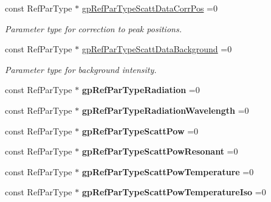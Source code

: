 \begin{DoxyCompactItemize}
const Ref\+Par\+Type $\ast$ \mbox{\hyperlink{namespace_obj_cryst_a647de83807cf5671a6ffd8c402a6ebf2}{gp\+Ref\+Par\+Type\+Scatt\+Data\+Corr\+Pos}} =0
\begin{DoxyCompactList}\small\item\em Parameter type for correction to peak positions. \end{DoxyCompactList}\item 
\mbox{\label{namespace_obj_cryst_a713fa15995c98dcd5cf5e2dbfed2dc12}} 
const Ref\+Par\+Type $\ast$ \mbox{\hyperlink{namespace_obj_cryst_a713fa15995c98dcd5cf5e2dbfed2dc12}{gp\+Ref\+Par\+Type\+Scatt\+Data\+Background}} =0
\begin{DoxyCompactList}\small\item\em Parameter type for background intensity. \end{DoxyCompactList}\item 
\mbox{\label{namespace_obj_cryst_ab8d362676b072a0af9c1faec189c5cc3}} 
const Ref\+Par\+Type $\ast$ {\bfseries gp\+Ref\+Par\+Type\+Radiation} =0
\item 
\mbox{\label{namespace_obj_cryst_a7f394acf301f2f72112266dfe499d685}} 
const Ref\+Par\+Type $\ast$ {\bfseries gp\+Ref\+Par\+Type\+Radiation\+Wavelength} =0
\item 
\mbox{\label{namespace_obj_cryst_aa2d7c190c84eddae7e360f025d22869e}} 
const Ref\+Par\+Type $\ast$ {\bfseries gp\+Ref\+Par\+Type\+Scatt\+Pow} =0
\item 
\mbox{\label{namespace_obj_cryst_a2c94667605cfd05f1eb81215ec70116a}} 
const Ref\+Par\+Type $\ast$ {\bfseries gp\+Ref\+Par\+Type\+Scatt\+Pow\+Resonant} =0
\item 
\mbox{\label{namespace_obj_cryst_a2a011bf76c01de4758b5dc80b606623b}} 
const Ref\+Par\+Type $\ast$ {\bfseries gp\+Ref\+Par\+Type\+Scatt\+Pow\+Temperature} =0
\item 
\mbox{\label{namespace_obj_cryst_a6478d7e6cb99a00b3af44f7f2535e850}} 
const Ref\+Par\+Type $\ast$ {\bfseries gp\+Ref\+Par\+Type\+Scatt\+Pow\+Temperature\+Iso} =0
\item 
\mbox{\label{namespace_obj_cryst_a8e836a037f74202afc1fb0e92a651f49}} 

\end{DoxyCompactItemize}
